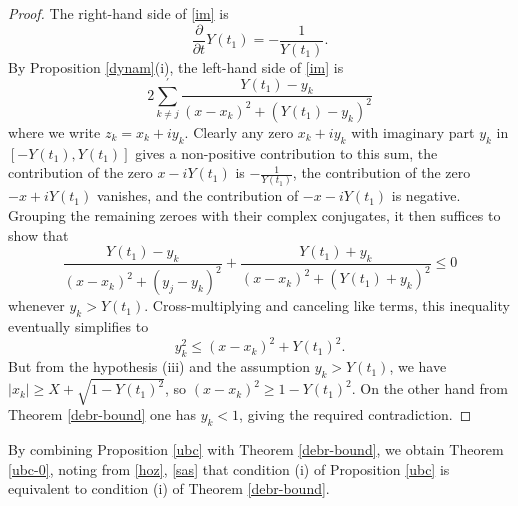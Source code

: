 \begin{proof}
The right-hand side of \eqref{im} is
$$ \frac{\partial}{\partial t} Y(t_1) = -\frac{1}{Y(t_1)}.$$
By Proposition \ref{dynam}(i), the left-hand side of \eqref{im} is
$$ 2 \sum_{k \neq j}^{\prime} \frac{Y(t_1) - y_k}{(x-x_k)^2 + (Y(t_1)-y_k)^2}$$
where we write $z_k = x_k + i y_k$.  Clearly any zero $x_k+iy_k$ with imaginary part $y_k$ in $[-Y(t_1),Y(t_1)]$ gives a non-positive contribution to this sum, the contribution of the zero $x- iY(t_1)$ is $-\frac{1}{Y(t_1)}$, the contribution of the zero $-x+iY(t_1)$ vanishes, and the contribution of $-x-iY(t_1)$ is negative.  Grouping the remaining zeroes with their complex conjugates, it then suffices to show that
$$ \frac{Y(t_1) - y_k}{(x-x_k)^2 + (y_j-y_k)^2} + \frac{Y(t_1) + y_k}{(x-x_k)^2 + (Y(t_1)+y_k)^2} \leq 0$$
whenever $y_k > Y(t_1)$.  Cross-multiplying and canceling like terms, this inequality eventually simplifies to
$$ y_k^2 \leq (x-x_k)^2 + Y(t_1)^2.$$
But from the hypothesis (iii) and the assumption $y_k > Y(t_1)$, we have $|x_k| \geq X+\sqrt{1-Y(t_1)^2}$, so $(x-x_k)^2 \geq 1-Y(t_1)^2$.  On the other hand from Theorem \ref{debr-bound} one has $y_k < 1$, giving the required contradiction.
\end{proof}

By combining Proposition \ref{ubc} with Theorem \ref{debr-bound}, we obtain Theorem \ref{ubc-0}, noting from \eqref{hoz}, \eqref{sas} that condition (i) of Proposition \ref{ubc} is equivalent to condition (i) of Theorem \ref{debr-bound}.
